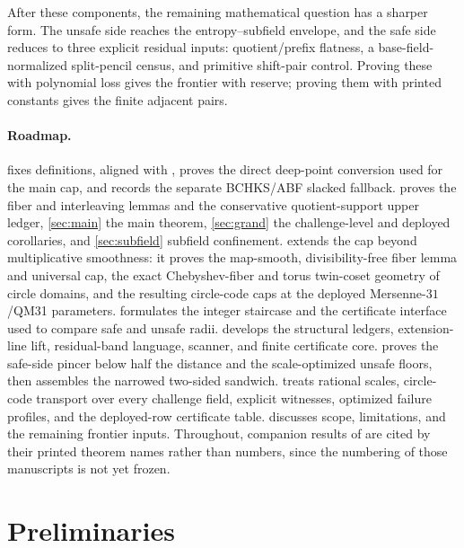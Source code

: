 \documentclass[11pt]{article}
\theoremstyle{definition}
\theoremstyle{remark}
\begin{document}
After these components, the remaining mathematical question has a sharper form.  The unsafe side reaches the entropy--subfield envelope, and the safe side reduces to three explicit residual inputs: quotient/prefix flatness, a base-field-normalized split-pencil census, and primitive shift-pair control.  Proving these with polynomial loss gives the frontier with reserve; proving them with printed constants gives the finite adjacent pairs.

\paragraph{Roadmap.}  fixes definitions, aligned with \cite[Defs.~4.1, 4.3]{ABF26}, proves the direct deep-point conversion used for the main cap, and records the separate BCHKS/ABF slacked fallback.  proves the fiber and interleaving lemmas and the conservative quotient-support upper ledger, \cref{sec:main} the main theorem, \cref{sec:grand} the challenge-level and deployed corollaries, and \cref{sec:subfield} subfield confinement.  extends the cap beyond multiplicative smoothness: it proves the map-smooth, divisibility-free fiber lemma and universal cap, the exact Chebyshev-fiber and torus twin-coset geometry of circle domains, and the resulting circle-code caps at the deployed Mersenne-$31$/QM31 parameters.  formulates the integer staircase and the certificate interface used to compare safe and unsafe radii.   develops the structural ledgers, extension-line lift, residual-band language, scanner, and finite certificate core.   proves the safe-side pincer below half the distance and the scale-optimized unsafe floors, then assembles the narrowed two-sided sandwich.   treats rational scales, circle-code transport over every challenge field, explicit witnesses, optimized failure profiles, and the deployed-row certificate table.   discusses scope, limitations, and the remaining frontier inputs.  Throughout, companion results of \cite{Cho26a,Cho26b} are cited by their printed theorem names rather than numbers, since the numbering of those manuscripts is not yet frozen.

\section{Preliminaries}\label{sec:prelim}
\end{document}
